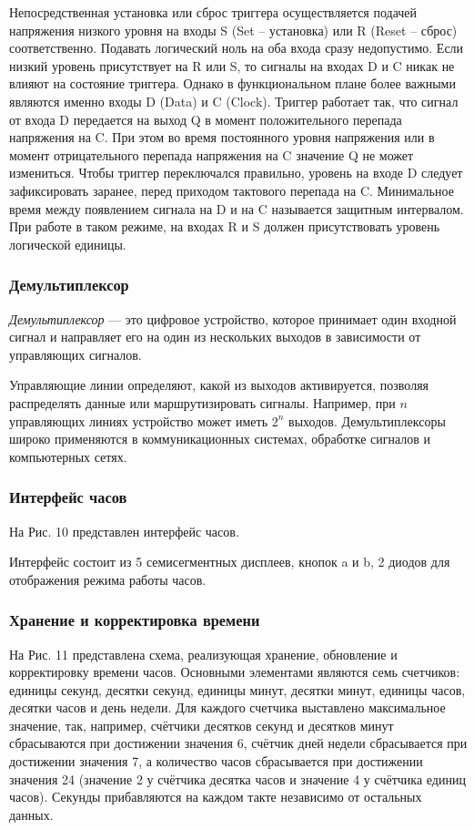 \documentclass[a4paper, final]{article}
\begin{document}
Непосредственная установка или сброс триггера осуществляется подачей напряжения низкого уровня на входы S (Set -- установка) или R (Reset -- сброс) соответственно. Подавать логический ноль на оба входа сразу недопустимо. Если низкий уровень присутствует на R или S, то сигналы на входах D и C никак не влияют на состояние триггера. Однако в функциональном плане более важными являются именно входы D (Data) и C (Clock). Триггер работает так, что сигнал от входа D передается на выход Q в момент положительного перепада напряжения на C. При этом во время постоянного уровня напряжения или в момент отрицательного перепада напряжения на C значение Q не может измениться. Чтобы триггер переключался правильно, уровень на входе D следует зафиксировать заранее, перед приходом тактового перепада на C. Минимальное время между появлением сигнала на D и на C называется защитным интервалом. При работе в таком режиме, на входах R и S должен присутствовать уровень логической единицы.

\subsubsection{Демультиплексор}
\textit{Демультиплексор} --- это цифровое устройство, которое принимает один входной сигнал и направляет его на один из нескольких выходов в зависимости от управляющих сигналов.

Управляющие линии определяют, какой из выходов активируется, позволяя распределять данные или маршрутизировать сигналы. Например, при $n$ управляющих линиях устройство может иметь $2^n$ выходов. Демультиплексоры широко применяются в коммуникационных системах, обработке сигналов и компьютерных сетях.

\subsubsection{Интерфейс часов}
На Рис. 10 представлен интерфейс часов.

\newpage

\newpage

Интерфейс состоит из 5 семисегментных дисплеев, кнопок a и b, 2 диодов для отображения режима работы часов.

\subsubsection{Хранение и корректировка времени}
На Рис. 11 представлена схема, реализующая хранение, обновление и корректировку времени часов. Основными элементами являются семь счетчиков: единицы секунд, десятки секунд, единицы минут, десятки минут, единицы часов, десятки часов и день недели. Для каждого счетчика выставлено максимальное значение, так, например, счётчики десятков секунд и десятков минут сбрасываются при достижении значения 6, счётчик дней недели сбрасывается при достижении значения 7, а количество часов сбрасывается при достижении значения 24 (значение 2 у счётчика десятка часов и значение 4 у счётчика единиц часов). Секунды прибавляются на каждом такте независимо
от остальных данных.
\end{document}

